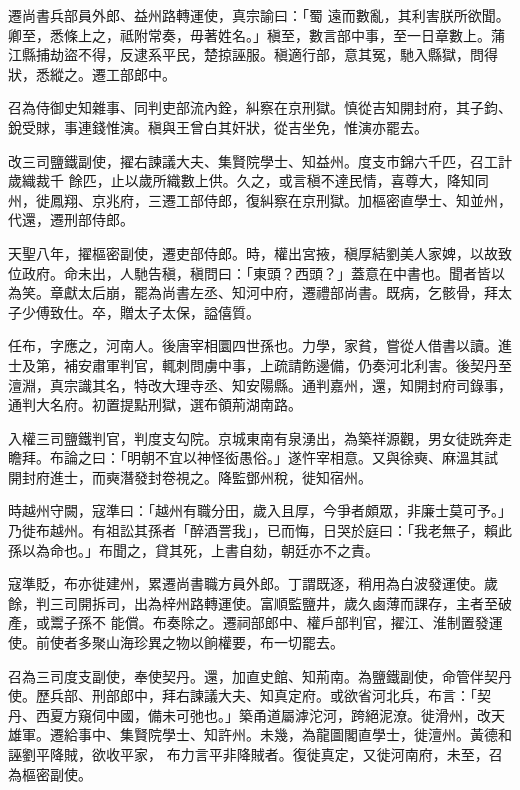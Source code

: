 \begin{pinyinscope}
 遷尚書兵部員外郎、益州路轉運使，真宗諭曰：「蜀
 遠而數亂，其利害朕所欲聞。卿至，悉條上之，祗附常奏，毋著姓名。」稹至，數言部中事，至一日章數上。蒲江縣捕劫盜不得，反逮系平民，楚掠誣服。稹適行部，意其冤，馳入縣獄，問得狀，悉縱之。遷工部郎中。



 召為侍御史知雜事、同判吏部流內銓，糾察在京刑獄。慎從吉知開封府，其子鈞、銳受賕，事連錢惟演。稹與王曾白其奸狀，從吉坐免，惟演亦罷去。



 改三司鹽鐵副使，擢右諫議大夫、集賢院學士、知益州。度支市錦六千匹，召工計歲織裁千
 餘匹，止以歲所織數上供。久之，或言稹不達民情，喜尊大，降知同州，徙鳳翔、京兆府，三遷工部侍郎，復糾察在京刑獄。加樞密直學士、知並州，代還，遷刑部侍郎。



 天聖八年，擢樞密副使，遷吏部侍郎。時，權出宮掖，稹厚結劉美人家婢，以故致位政府。命未出，人馳告稹，稹問曰：「東頭？西頭？」蓋意在中書也。聞者皆以為笑。章獻太后崩，罷為尚書左丞、知河中府，遷禮部尚書。既病，乞骸骨，拜太子少傅致仕。卒，贈太子太保，謚僖質。



 任布，字應之，河南人。後唐宰相圜四世孫也。力學，家貧，嘗從人借書以讀。進士及第，補安肅軍判官，輒刺問虜中事，上疏請飭邊備，仍奏河北利害。後契丹至澶淵，真宗識其名，特改大理寺丞、知安陽縣。通判嘉州，還，知開封府司錄事，通判大名府。初置提點刑獄，選布領荊湖南路。



 入權三司鹽鐵判官，判度支勾院。京城東南有泉湧出，為築祥源觀，男女徒跣奔走瞻拜。布論之曰：「明朝不宜以神怪衒愚俗。」遂忤宰相意。又與徐奭、麻溫其試
 開封府進士，而奭潛發封卷視之。降監鄧州稅，徙知宿州。



 時越州守闕，寇準曰：「越州有職分田，歲入且厚，今爭者頗眾，非廉士莫可予。」乃徙布越州。有祖訟其孫者「醉酒詈我」，已而悔，日哭於庭曰：「我老無子，賴此孫以為命也。」布聞之，貸其死，上書自劾，朝廷亦不之責。



 寇準貶，布亦徙建州，累遷尚書職方員外郎。丁謂既逐，稍用為白波發運使。歲餘，判三司開拆司，出為梓州路轉運使。富順監鹽井，歲久鹵薄而課存，主者至破產，或鬻子孫不
 能償。布奏除之。遷祠部郎中、權戶部判官，擢江、淮制置發運使。前使者多聚山海珍異之物以餉權要，布一切罷去。



 召為三司度支副使，奉使契丹。還，加直史館、知荊南。為鹽鐵副使，命管伴契丹使。歷兵部、刑部郎中，拜右諫議大夫、知真定府。或欲省河北兵，布言：「契丹、西夏方窺伺中國，備未可弛也。」築甬道屬滹沱河，跨絕泥潦。徙滑州，改天雄軍。遷給事中、集賢院學士、知許州。未幾，為龍圖閣直學士，徙澶州。黃德和誣劉平降賊，欲收平家，
 布力言平非降賊者。復徙真定，又徙河南府，未至，召為樞密副使。




\end{pinyinscope}
